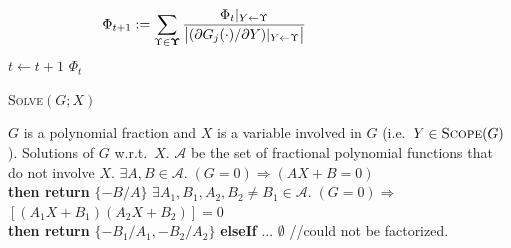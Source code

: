 \documentclass[]{article}
\begin{document}
\begin{algorithm}
\begin{algorithmic}
\begin{equation}
\label{e:core}
\hspace{-28mm}
\Phi_{t + 1} 
:=
\sum_{\Upsilon \in \boldsymbol{\Upsilon}}
\frac{{\Phi_t}|_{Y \leftarrow \Upsilon}}{
\big|(\partial G_j(\cdot) / \partial Y) |_{Y \leftarrow \Upsilon}
\big|
}
\end{equation} \vspace{-4mm}
	\STATE $t \leftarrow t + 1 $	
\ENDFOR
{} $\Phi_t$
\end{algorithmic}
\end{algorithm}
\begin{algorithm}[tb]%
\caption{\textsc{Solve}$(G; X)$    
\label{alg:solve}}
\begin{algorithmic}
 $G$ is a polynomial fraction and $X$ is a variable involved in $G$ (i.e.\ $Y \in \textsc{Scope}(G)$).
 Solutions of $G$ w.r.t.\ $X$.
 $\mathcal{A}$ be the set of fractional polynomial functions that do not involve $X$. 
{%
{} $\exists A, B \in \mathcal{A}. \; (G=0) \Rightarrow (A X + B = 0)$ 
\\\hspace{5mm}
{\bf then return} $\{-B/A\}$
 $\exists A_1, B_1, A_2, B_2 \neq B_1 \in \mathcal{A}.\; (G=0) \Rightarrow$
\\\hspace{5mm} 
$ [(A_1 X + B_1)(A_2 X + B_2)]=0$
\\\hspace{5mm} 
{\bf then return} $\{-B_1/A_1, -B_2/A_2\}$ {\bf elseIf} ...
 $\emptyset$ \hspace*{\fill} //could not be factorized. }
\end{algorithmic}
\end{algorithm}
\end{document}
